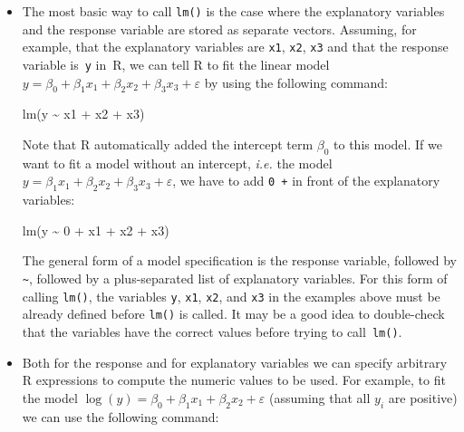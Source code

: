\documentclass[
  a4paper,
]{article}
\newenvironment{Shaded}{\begin{snugshade}}{\end{snugshade}}
\newcommand{\DecValTok}[1]{\textcolor[rgb]{0.00,0.00,0.81}{#1}}
\newcommand{\FunctionTok}[1]{\textcolor[rgb]{0.00,0.00,0.00}{#1}}
\newcommand{\NormalTok}[1]{#1}
\newcommand{\SpecialCharTok}[1]{\textcolor[rgb]{0.00,0.00,0.00}{#1}}
\theoremstyle{definition}
\theoremstyle{definition}
\theoremstyle{definition}
\theoremstyle{definition}
\theoremstyle{remark}
\begin{document}
\begin{itemize}
\item
  The most basic way to call \texttt{lm()} is the case where the explanatory
  variables and the response variable are stored as separate vectors.
  Assuming, for example, that the explanatory variables are \texttt{x1}, \texttt{x2}, \texttt{x3}
  and that the response variable is~\texttt{y} in~R, we can tell R to fit the
  linear model \(y = \beta_0 + \beta_1 x_1 + \beta_2 x_2 + \beta_3 x_3 + \varepsilon\)
  by using the following command:

\begin{Shaded}
\begin{Highlighting}[]
  \FunctionTok{lm}\NormalTok{(y }\SpecialCharTok{\textasciitilde{}}\NormalTok{ x1 }\SpecialCharTok{+}\NormalTok{ x2 }\SpecialCharTok{+}\NormalTok{ x3)}
\end{Highlighting}
\end{Shaded}

  Note that R automatically added the intercept term \(\beta_0\) to this
  model. If we want to fit a model without an intercept,
  \emph{i.e.} the model
  \(y = \beta_1 x_1 + \beta_2 x_2 + \beta_3 x_3 + \varepsilon\), we have to add
  \texttt{0\ +} in front of the explanatory variables:

\begin{Shaded}
\begin{Highlighting}[]
    \FunctionTok{lm}\NormalTok{(y }\SpecialCharTok{\textasciitilde{}} \DecValTok{0} \SpecialCharTok{+}\NormalTok{ x1 }\SpecialCharTok{+}\NormalTok{ x2 }\SpecialCharTok{+}\NormalTok{ x3)}
\end{Highlighting}
\end{Shaded}

  The general form of a model specification is the response variable,
  followed by \texttt{\textasciitilde{}}, followed by a plus-separated list of explanatory
  variables. For this form of calling \texttt{lm()}, the variables \texttt{y},
  \texttt{x1}, \texttt{x2}, and \texttt{x3} in the examples above must be already defined before
  \texttt{lm()} is called. It may be a good idea to double-check that the variables
  have the correct values before trying to call~\texttt{lm()}.
\item
  Both for the response and for explanatory variables we can
  specify arbitrary R expressions to compute the numeric values to be
  used. For example, to fit the model
  \(\log(y) = \beta_0 + \beta_1 x_1 + \beta_2 x_2 + \varepsilon\) (assuming
  that all \(y_i\) are positive) we can use the following command:


\end{itemize}
\end{document}
